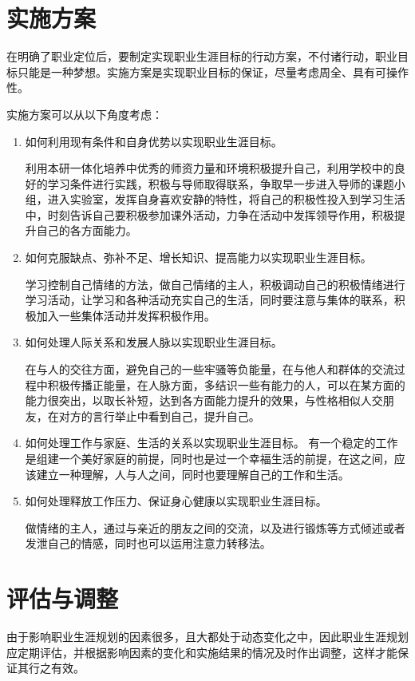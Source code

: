 \documentclass{article}
\begin{document}
\section{实施方案}
在明确了职业定位后，要制定实现职业生涯目标的行动方案，不付诸行动，职业目标只能是一种梦想。实施方案是实现职业目标的保证，尽量考虑周全、具有可操作性。\par
实施方案可以从以下角度考虑：\par
\begin{enumerate}[1、]
	\item 如何利用现有条件和自身优势以实现职业生涯目标。\par
	利用本研一体化培养中优秀的师资力量和环境积极提升自己，利用学校中的良好的学习条件进行实践，积极与导师取得联系，争取早一步进入导师的课题小组，进入实验室，发挥自身喜欢安静的特性，将自己的积极性投入到学习生活中，时刻告诉自己要积极参加课外活动，力争在活动中发挥领导作用，积极提升自己的各方面能力。\par
	\item 如何克服缺点、弥补不足、增长知识、提高能力以实现职业生涯目标。\par
	学习控制自己情绪的方法，做自己情绪的主人，积极调动自己的积极情绪进行学习活动，让学习和各种活动充实自己的生活，同时要注意与集体的联系，积极加入一些集体活动并发挥积极作用。\par
	\item 如何处理人际关系和发展人脉以实现职业生涯目标。\par
	在与人的交往方面，避免自己的一些牢骚等负能量，在与他人和群体的交流过程中积极传播正能量，在人脉方面，多结识一些有能力的人，可以在某方面的能力很突出，以取长补短，达到各方面能力提升的效果，与性格相似人交朋友，在对方的言行举止中看到自己，提升自己。\par
	\item 如何处理工作与家庭、生活的关系以实现职业生涯目标。
	有一个稳定的工作是组建一个美好家庭的前提，同时也是过一个幸福生活的前提，在这之间，应该建立一种理解，人与人之间，同时也要理解自己的工作和生活。\par
	\item 如何处理释放工作压力、保证身心健康以实现职业生涯目标。\par
	做情绪的主人，通过与亲近的朋友之间的交流，以及进行锻炼等方式倾述或者发泄自己的情感，同时也可以运用注意力转移法。\par
	
\end{enumerate}
\par 
\section{评估与调整}
由于影响职业生涯规划的因素很多，且大都处于动态变化之中，因此职业生涯规划应定期评估，并根据影响因素的变化和实施结果的情况及时作出调整，这样才能保证其行之有效。\par 
\end{document}
